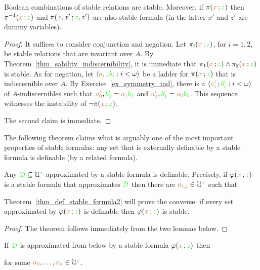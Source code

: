 \begin{lemma}\label{lem_stab_Boole}
  Boolean combinations of stable relations are stable.
  Moreover, if $\pi({\color{brown} x}\,;{\color{green} z})$ then  $\pi^{-1}({\color{brown} x}\,;{\color{green} z})$ and $\pi({\color{brown} x},x'\,;{\color{green} z},z')$ are also stable formula (in the latter $x'$ and $z'$ are dummy variables).
\end{lemma}

\begin{proof}
  It suffices to consider conjunction and negation.
  Let $\pi_i({\color{brown} x}\,;{\color{green} z})$, for $i=1,2$,  be stable relations that are invariant over $A$.
  By Theorem~\ref{thm_sability_indiscernibility}, it is immediate that $\pi_1({\color{brown} x}\,;{\color{green} z})\wedge\pi_2({\color{brown} x}\,;{\color{green} z})$ is stable.
  As for negation, let $\langle{\color{brown}a_i}\,;{\color{green} b_i} : i<\omega\rangle$ be a ladder for $\pi({\color{brown} x}\,;{\color{green} z})$ that is indiscernible over $A$.
  By Exercise~\ref{ex_symmetry_ind}, there is a $\langle{\color{brown}a'_i}\,;{\color{green} b'_i} : i<\omega\rangle$ of $A$-indiscernibles such that ${\color{brown} a'_0},{\color{green} b'_0}={\color{brown} a_1}{\color{green} b_1}$ and ${\color{brown} a'_1},{\color{green} b'_1}={\color{brown} a_0}{\color{green} b_0}$.
  This sequence witnesses the instability of $\neg\pi({\color{brown} x}\,;{\color{green} z})$.

  The second claim is immediate.
\end{proof}

The following theorem claims what is arguably one of the most important properties of stable formulas: any set that is externally definable by a stable formula is definable (by a related formula).

\begin{theorem}\label{thm_def_stable_formula}
Any ${\color{green}\EuScript D}\subseteq\EuScript U^{\color{green} z}$ approximated by a stable formula is definable.
Precisely, if $\varphi({\color{brown} x}\,;{\color{green} z})$ is a stable formula that approximates ${\color{green}\EuScript D}$ then there are ${\color{brown} a_{i,j}}\in\EuScript U^{\color{brown} x}$ such that

\end{theorem}

Theorem~\ref{thm_def_stable_formula2} will prove the converse: if every set approximated by $\varphi({\color{brown} x}\,;{\color{green} z})$ is definable then $\varphi({\color{brown} x}\,;{\color{green} z})$ is stable.

\begin{proof}
  The theorem follows immediately from the two lemmas below.
\end{proof}

\begin{lemma}
If ${\color{green}\EuScript D}$ is approximated from below by a stable formula $\varphi({\color{brown} x}\,;{\color{green} z})$ then


for some ${\color{brown} a_0},\dots,{\color{brown} a_n}\in\EuScript U^{\color{brown} x}$.
\end{lemma}

